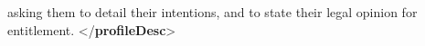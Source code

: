\begin{shaded}
\hspace*{1em}\hspace*{1em}\hspace*{1em}\hspace*{1em}\hspace*{1em}\hspace*{1em} asking them to detail their intentions, and to\mbox{}\newline 
\hspace*{1em}\hspace*{1em}\hspace*{1em}\hspace*{1em}\hspace*{1em}\hspace*{1em} state their legal opinion for entitlement.\mbox{}\newline 
\hspace*{1em}\hspace*{1em}\mbox{}\newline 
\hspace*{1em}\mbox{}\newline 
{}\mbox{}\newline 
{</\textbf{profileDesc}>}\end{shaded}\egroup\par 
